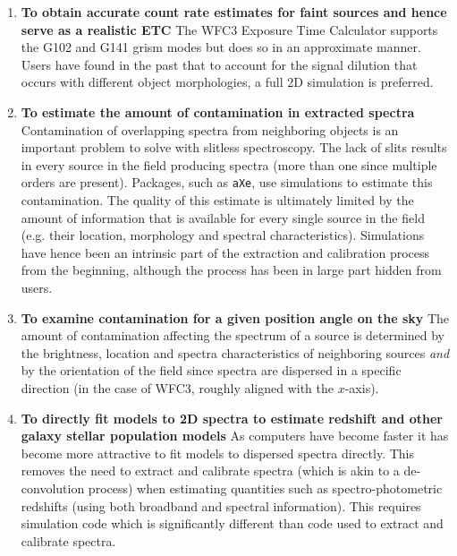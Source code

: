 \documentclass[preprint]{aastex}
\begin{document}
\begin{enumerate}
\item {\bf To obtain accurate count rate estimates for faint sources and hence serve as a realistic ETC}
The WFC3 Exposure Time Calculator supports the G102 and G141 grism modes but does so in an approximate manner. Users have found in the past that to account for the signal dilution that occurs with different object morphologies, a full 2D simulation is preferred. 


\item {\bf To estimate the amount of contamination in extracted spectra}
Contamination of overlapping spectra from neighboring objects is an important problem to solve with slitless spectroscopy. The lack of slits results in every source in the field producing spectra (more than one since multiple orders are present). Packages, such as \texttt{aXe}, use simulations to estimate this contamination. The quality of this estimate is ultimately limited by the amount of information that is available for every single source in the field (e.g. their location, morphology and spectral characteristics). Simulations have hence been an intrinsic part of the extraction and calibration process from the beginning, although the process has been in large part hidden from users.

\item {\bf To examine contamination for a given position angle on the sky}
The amount of contamination affecting  the spectrum of a source is determined by the brightness, location and spectra characteristics of neighboring sources {\em and} by the orientation of the field since spectra are dispersed in a specific direction (in the case of WFC3, roughly aligned with the $x$-axis).

\item {\bf To directly fit models to 2D spectra to estimate redshift and other galaxy stellar population models}
As computers have become faster it has become more attractive to fit models to dispersed spectra directly. This removes the need to extract and calibrate spectra (which is akin to a de-convolution process) when estimating quantities such as spectro-photometric redshifts (using both broadband and spectral information). This requires simulation code which is significantly different than code used to extract and calibrate spectra.

\end{enumerate}


\end{document}
